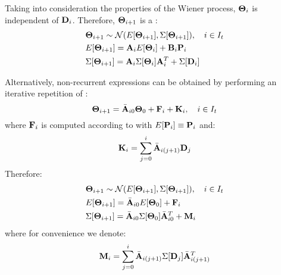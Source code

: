 Taking into consideration the properties of the Wiener process, $\mathbf{\Theta}_i$ is independent of $\mathbf{D}_i$. Therefore, $\mathbf{\Theta}_{i+1}$ is a \mnrv:
\begin{align*}
  & \mathbf{\Theta}_{i + 1} \sim \mathcal{N}(E[\mathbf{\Theta}_{i + 1}], \Sigma[\mathbf{\Theta}_{i + 1}]), \hspace{10pt} i \in I_t \\
  & E[\mathbf{\Theta}_{i+1}] = \mathbf{A}_i E[\mathbf{\Theta}_i] + \mathbf{B}_i \mathbf{P}_i \\
  & \Sigma[\mathbf{\Theta}_{i+1}] = \mathbf{A}_i \Sigma[\mathbf{\Theta}_i] \mathbf{A}^T_i + \Sigma[\mathbf{D}_i]
\end{align*}

Alternatively, non-recurrent expressions can be obtained by performing an iterative repetition of :
\begin{equation} \equlabel{tta-fourier-noise-non-recurrent}
  \vtemperature_{i + 1} = \am{A}_{i0} \vtemperature_0 + \m{F}_i + \v{K}_i, \sep i \in \timeindex
\end{equation}
where $\mathbf{F}_i$ is computed according to  with $E[\mathbf{P}_i] \equiv \mathbf{P}_i$ and:
\begin{equation} \equlabel{k}
  \v{K}_i = \sum_{j = 0}^{i} \am{A}_{i(j+1)} \m{D}_j
\end{equation}
Therefore:
\begin{align*}
  & \mathbf{\Theta}_{i + 1} \sim \mathcal{N}(E[\mathbf{\Theta}_{i + 1}], \Sigma[\mathbf{\Theta}_{i + 1}]), \hspace{10pt} i \in I_t \\
  & E[\mathbf{\Theta}_{i + 1}] = \Bar{\mathbf{A}}_{i0} E[\mathbf{\Theta}_0] + \mathbf{F}_i \\
  & \Sigma[\mathbf{\Theta}_{i + 1}] = \Bar{\mathbf{A}}_{i0} \Sigma[\mathbf{\Theta}_0] \Bar{\mathbf{A}}_{i0}^T + \mathbf{M}_i
\end{align*}
where for convenience we denote:
\begin{equation} \equlabel{m}
  \m{M}_i = \sum_{j = 0}^{i} \am{A}_{i(j+1)} \covariance{\m{D}_j} \am{A}_{i(j+1)}^T
\end{equation}
